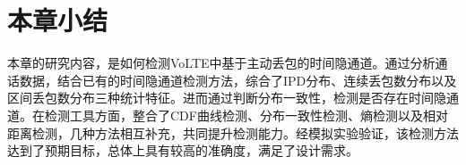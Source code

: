 \section{本章小结}
\label{chap:analyze:summary}

本章的研究内容，是如何检测VoLTE中基于主动丢包的时间隐通道。通过分析通话数据，结合已有的时间隐通道检测方法，综合了IPD分布、连续丢包数分布以及区间丢包数分布三种统计特征。进而通过判断分布一致性，检测是否存在时间隐通道。在检测工具方面，整合了CDF曲线检测、分布一致性检测、熵检测以及相对距离检测，几种方法相互补充，共同提升检测能力。经模拟实验验证，该检测方法达到了预期目标，总体上具有较高的准确度，满足了设计需求。
